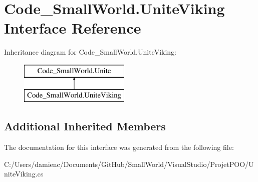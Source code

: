 \hypertarget{interface_code___small_world_1_1_unite_viking}{\section{Code\-\_\-\-Small\-World.\-Unite\-Viking Interface Reference}
\label{interface_code___small_world_1_1_unite_viking}
}
Inheritance diagram for Code\-\_\-\-Small\-World.\-Unite\-Viking\-:\begin{figure}[H]
\begin{center}
\leavevmode
\includegraphics[height=2.000000cm]{interface_code___small_world_1_1_unite_viking}
\end{center}
\end{figure}
\subsection*{Additional Inherited Members}


The documentation for this interface was generated from the following file\-:\begin{DoxyCompactItemize}
\item 
C\-:/\-Users/damienc/\-Documents/\-Git\-Hub/\-Small\-World/\-Visual\-Studio/\-Projet\-P\-O\-O/Unite\-Viking.\-cs\end{DoxyCompactItemize}

